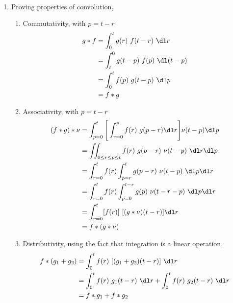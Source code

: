 \begin{enumerate}
    \item Proving properties of convolution,
          \begin{enumerate}
              \item Commutativity, with $ p = t-r $
                    \begin{align}
                        g * f & = \int_{0}^{t} g(r)\ f(t - r)\ \dl r       \\
                              & = \int_{t}^{0} g(t - p)\ f(p)\ \dl (t - p) \\
                              & = \int_{0}^{t} f(p)\ g(t-p)\ \dl p         \\
                              & = f * g
                    \end{align}
              \item Associativity, with $ p = t-r $
                    \begin{align}
                        (f * g) * \nu & = \int_{p=0}^{t}\Bigg[ \int_{r=0}^{p} f(r)
                        \ g(p-r) \dl r \Bigg] \nu(t-p) \dl p                          \\
                                      & = \iint_{0 \leq r \leq p \leq t}
                        f(r) \ g(p-r)\ \nu(t-p)\ \dl r \dl p                          \\
                                      & = \int_{r=0}^{t} f(r) \int_{p=r}^{t} g(p - r)
                        \ \nu(t - p)\ \dl p \dl r                                     \\
                                      & = \int_{r=0}^{t} f(r) \int_{p=0}^{t-r} g(p)
                        \ \nu(t - r - p)\ \dl p \dl r                                 \\
                                      & = \int_{r=0}^{t} [f(r)]\ [(g * \nu)(t - r)]
                        \dl r                                                         \\
                                      & = f * (g * \nu)
                    \end{align}

              \item Distributivity, using the fact that integration is a linear
                    operation,
                    \begin{align}
                        f * (g_1 + g_2) & = \int_{0}^{t} f(r)\ [(g_1 + g_2)(t-r)]
                        \ \dl r                                                   \\
                                        & = \int_{0}^{t} f(r)\ g_1(t-r)\ \dl r
                        + \int_{0}^{t} f(r)\ g_2(t-r)\ \dl r                      \\
                                        & = f * g_1 + f * g_2
                    \end{align}


\end{enumerate}
\end{enumerate}

